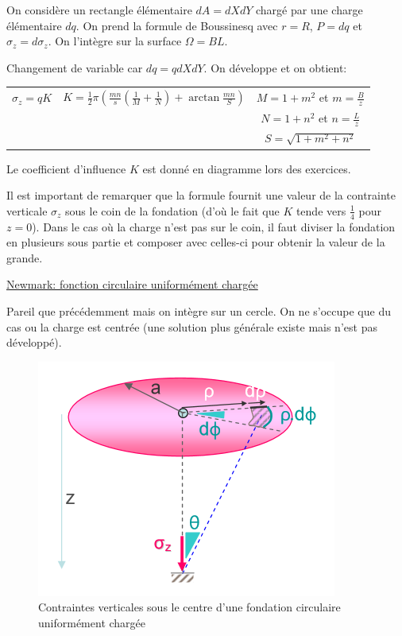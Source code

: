            On considère un rectangle élémentaire $dA = dX dY$ chargé par une charge élémentaire $dq$. On prend la formule de Boussinesq avec $r=R$, $P=dq$ et $\sigma_z = d\sigma_z$. On l'intègre sur la surface $\Omega = B L$.
            
            Changement de variable car $dq = q dX dY$. On développe et on obtient:
            
            \begin{center}
            \begin{tabular}{c|c|c}
                 $\sigma_z = q K$ \: \: \: &  $K=\frac{1}{2} \pi (\frac{mn}{s} (\frac{1}{M}+\frac{1}{N}) + \arctan \frac{mn}{S})$ 
                    &   $M = 1+m^2$  et  $m = \frac{B}{z}$ \\
                  & &  $N = 1+n^2$  et  $n = \frac{L}{z}$ \\
                  & &  $S = \sqrt{1+m^2+n^2}$  \\
            \end{tabular}
            \end{center}
            
            Le coefficient d'influence $K$ est donné en diagramme lors des exercices.
            
            Il est important de remarquer que la formule fournit une valeur de la contrainte verticale $\sigma_z$ sous le coin de la fondation (d'où le fait que $K$ tende vers $\frac{1}{4}$ pour $z = 0$). Dans le cas où la charge n'est pas sur le coin, il faut diviser la fondation en plusieurs sous partie et composer avec celles-ci pour obtenir la valeur de la grande. 
        
            
                \underline{Newmark: fonction circulaire uniformément chargée} 
            
                Pareil que précédemment mais on intègre sur un cercle. On ne s'occupe que du cas ou la charge est centrée (une solution plus générale existe mais n'est pas développé).
            
                \begin{figure}[h!]
                    \center
                    \includegraphics[scale=0.8]{Holeyman/images/H29.PNG}
                    \caption{Contraintes verticales sous le centre d'une fondation circulaire uniformément chargée}
                \end{figure}
            
